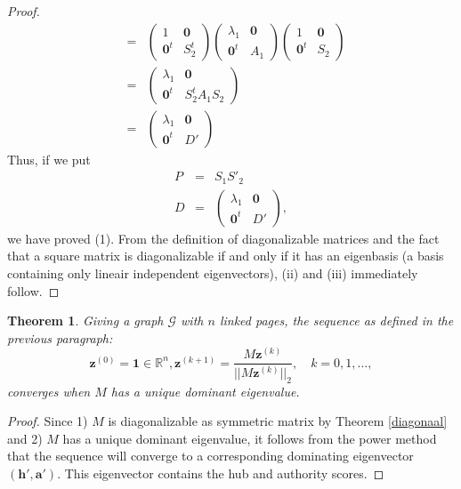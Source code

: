 \documentclass[a4paper,11pt]{report}
\newtheorem{theorem}{Theorem}[section]
\newcommand{\R}{{\mathbb R}}
\newcommand{\graf}{\mathscr{G}}
\begin{document}
\begin{proof}
\begin{eqnarray*}
&=& \left(
\begin{array}{c|c}
1 & \mathbf{0} \\ \hline
\mathbf{0}^t & S^t_2
\end{array}\right) 
\left(
\begin{array}{c|c}
\lambda_1 & \mathbf{0} \\ \hline
\mathbf{0}^t & A_1
\end{array}\right) 
 \left(
\begin{array}{c|c}
1 & \mathbf{0} \\ \hline
\mathbf{0}^t & S_2
\end{array}\right) \\
&=& 
 \left(
\begin{array}{c|c}
\lambda_1 & \mathbf{0} \\ \hline
\mathbf{0}^t & S^t_2A_1S_2
\end{array}\right) \\
&=&
 \left(
\begin{array}{c|c}
\lambda_1 & \mathbf{0} \\ \hline
\mathbf{0}^t & D'\end{array}\right) 
\end{eqnarray*}
Thus, if we put
\begin{eqnarray*}
P &=& S_1S'_2\\
D &=& \left(
\begin{array}{c|c}
\lambda_1 & \mathbf{0} \\ \hline
\mathbf{0}^t & D'\end{array}\right),
\end{eqnarray*}
we have proved (1). From the definition of diagonalizable matrices and the fact 
that a square matrix is diagonalizable if and only if it has an eigenbasis (a basis containing only lineair independent 
eigenvectors),
(ii) and (iii) immediately follow.
\end{proof}
 \begin{theorem}
   Giving a graph $\graf$ with $n$ linked pages, the sequence as defined in the previous paragraph: 
   $$\mathbf{z}^{(0)} = \mathbf{1} \in \R^{n}, \mathbf{z}^{(k+1)} = \frac{M\mathbf{z}^{(k)}}{||M\mathbf{z}^{(k)}||_2}, \quad k = 
  0,1,\ldots,$$
  converges when $M$ has a unique dominant eigenvalue.
 \end{theorem}
\begin{proof}
  Since 1) $M$ is diagonalizable as symmetric matrix by Theorem \ref{diagonaal}  
  and 2) $M$ has a unique dominant eigenvalue, it follows from the power method that
  the sequence will converge to a corresponding dominating eigenvector $(\mathbf{h'}, \mathbf{a'})$. This eigenvector contains the hub and authority scores.
  \end{proof}
\end{document}
